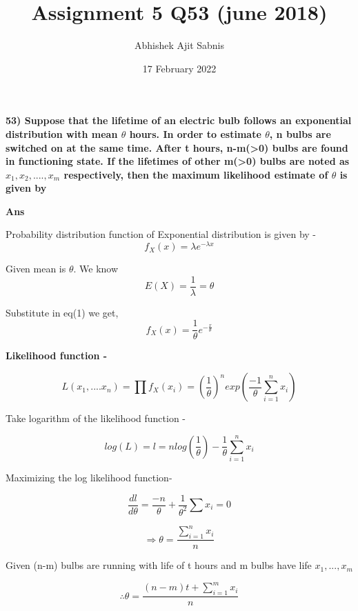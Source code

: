 \documentclass{article}
\title{\textbf{Assignment 5 Q53 (june 2018)}}
\author{Abhishek Ajit Sabnis}
\date{17 February 2022}
\begin{document}
\maketitle

\textbf{53) Suppose that the lifetime of an electric bulb follows an exponential distribution with mean $\theta$ hours. In order to estimate $\theta$, n bulbs are switched on at the same time. After t hours, n-m(>0) bulbs are found in functioning state. If the lifetimes of other m(>0) bulbs are noted as $x_1, x_2,....,x_m$ respectively, then the maximum likelihood estimate of $\theta$ is given by  }

\vspace{0.5cm}

\textbf{Ans} 

Probability distribution function of Exponential distribution is given by - 
\begin{equation}
    f_X(x) = \lambda e^{-\lambda x}
\end{equation}

Given mean is $\theta$. We know
\begin{equation}
    E(X) = \frac{1}{\lambda} = \theta
\end{equation}

Substitute in eq(1) we get,
\begin{equation}
    f_X(x) = \frac{1}{\theta} e^{-\frac{x}{\theta}}
\end{equation}

\textbf{Likelihood function -}

\begin{equation}
    L(x_1,....x_n) = \prod f_X(x_i) = (\frac{1}{\theta})^n exp(\frac{-1}{\theta} \sum_{i=1}^{n} x_i)
\end{equation}

Take logarithm of the likelihood function - 

\begin{equation}
    log(L) = l = n log(\frac{1}{\theta}) - \frac{1}{\theta} \sum_{i=1}^{n} x_i
\end{equation}

Maximizing the log likelihood function- 

\begin{equation}
    \frac{dl}{d\theta} = \frac{-n}{\theta} + \frac{1}{\theta^2} \sum x_i =0
\end{equation}

\begin{equation}
    \Rightarrow \theta = \frac{\sum_{i=1}^{n} x_i}{n}
\end{equation}

Given (n-m) bulbs are running with life of t hours and m bulbs have life $x_1,...,x_m$

\begin{equation}
    \therefore \theta = \frac{(n-m)t + \sum_{i=1}^{m} x_i}{n}
\end{equation}
\end{document}
